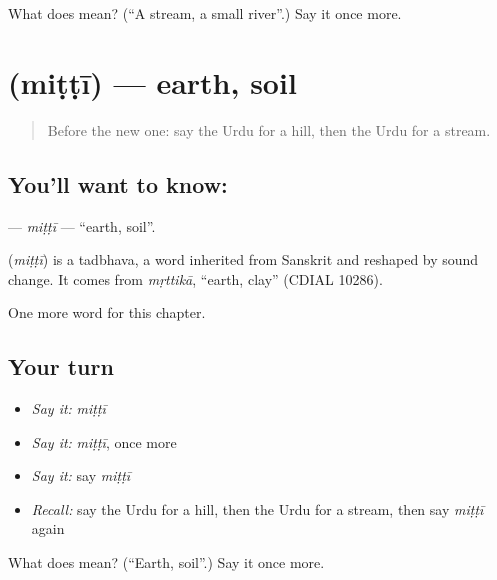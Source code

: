 \begin{tcolorbox}[breakable,colback=teal!4,colframe=teal!35!black,title={Before you move on}]
What does  mean? (\textquotedblleft{}A stream, a small river\textquotedblright{}.) Say it once more.
\end{tcolorbox}
\section[\texorpdfstring{\ur{مٹی} (miṭṭī)}{مٹی (miṭṭī)}]{ (miṭṭī) — earth, soil}

\label{lesson:UR-C123-mitti}



\begin{quote}
Before the new one: say the Urdu for a hill, then the Urdu for a stream.
\end{quote}

\subsection*{You'll want to know: }
\textbf{} — \emph{miṭṭī} — \textquotedblleft{}earth, soil\textquotedblright{}.

\begin{cousinweb}
\textbf{} (\emph{miṭṭī}) is a tadbhava, a word inherited from Sanskrit and reshaped by sound change. It comes from \emph{mṛttikā}, \textquotedblleft{}earth, clay\textquotedblright{} (CDIAL 10286).
\end{cousinweb}

\begin{grammarlens}[title={What you've built}]
One more word for this chapter.
\end{grammarlens}

\subsection*{Your turn}
\begin{itemize}
\raggedright
  \item \emph{Say it:} \emph{miṭṭī}
  \item \emph{Say it:} \emph{miṭṭī}, once more
  \item \emph{Say it:} say \emph{miṭṭī}
  \item \emph{Recall:} say the Urdu for a hill, then the Urdu for a stream, then say \emph{miṭṭī} again
\end{itemize}

\begin{tcolorbox}[breakable,colback=teal!4,colframe=teal!35!black,title={Before you move on}]
What does  mean? (\textquotedblleft{}Earth, soil\textquotedblright{}.) Say it once more.
\end{tcolorbox}
